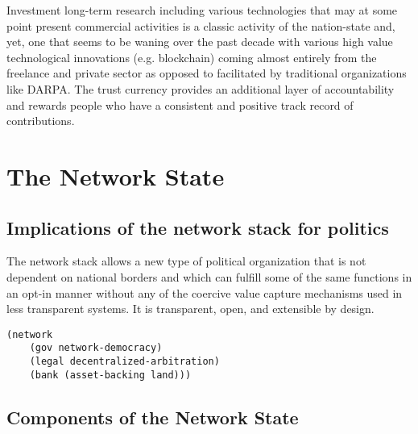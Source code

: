 \documentclass{article}
\begin{document}
Investment long-term research including various technologies that may at some point present commercial activities is a classic activity of the nation-state and, yet, one that seems to be waning over the past decade with various high value technological innovations (e.g. blockchain) coming almost entirely from the freelance and private sector as opposed to facilitated by traditional organizations like DARPA. The trust currency provides an additional layer of accountability and rewards people who have a consistent and positive track record of contributions.


\section { The Network State }

\subsection { Implications of the network stack for politics  }

The network stack allows a new type of political organization that is not dependent on national borders and which can fulfill some of the same functions in an opt-in manner without any of the coercive value capture mechanisms used in less transparent systems. It is transparent, open, and extensible by design.

\begin{lstlisting}
(network
    (gov network-democracy)
    (legal decentralized-arbitration)
    (bank (asset-backing land)))
\end{lstlisting}

\subsection { Components of the Network State }
\end{document}
